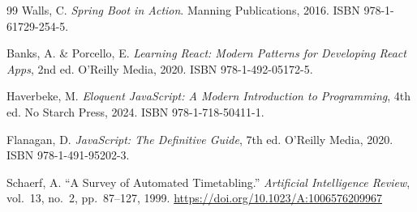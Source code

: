 \begin{thebibliography}{99}
Walls, C. \textit{Spring Boot in Action}. Manning Publications, 2016. ISBN 978-1-61729-254-5.

Banks, A. \& Porcello, E. \textit{Learning React: Modern Patterns for Developing React Apps}, 2nd ed. O'Reilly Media, 2020. ISBN 978-1-492-05172-5.

Haverbeke, M. \textit{Eloquent JavaScript: A Modern Introduction to Programming}, 4th ed. No Starch Press, 2024. ISBN 978-1-718-50411-1.

Flanagan, D. \textit{JavaScript: The Definitive Guide}, 7th ed. O'Reilly Media, 2020. ISBN 978-1-491-95202-3.

Schaerf, A. ``A Survey of Automated Timetabling.'' \textit{Artificial Intelligence Review}, vol.~13, no.~2, pp.~87--127, 1999. \url{https://doi.org/10.1023/A:1006576209967}

\end{thebibliography}
